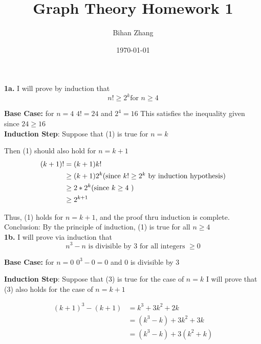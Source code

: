 \documentclass[12pt]{article}
\title{Graph Theory Homework 1}
\author{Bihan Zhang}
\date{\today}
\begin{document}
	\maketitle
	
	\textbf{1a.}
	I will prove by induction that 
    \begin{equation}
 		   n!\geq 2^k \mbox{for } n \geq 4 
	\end{equation}
  	  
  	\textbf{Base Case:} for $ n = 4 $ $ 4! = 24 $ and $ 2^4 = 16 $ This satisfies the inequality given since $ 24 \geq 16 $ \\
	  
	  
	\textbf{Induction Step}: Suppose that (1) is true for $ n = k $
	  
	Then (1) should also hold for $ n = k+1 $
	\begin{equation}
	\begin{split}
	(k+1)! & = (k+1)k!  \\
	& \geq (k+1)2^k \mbox{(since $ k! \geq 2^k $ by induction hypothesis)} \\
	& \geq 2*2^k \mbox{(since $ k \geq 4 $ )} \\
	& \geq 2^{k+1} 
	\end{split}
	\end{equation}
  
  	Thus, (1) holds for $ n = k + 1 $, and the proof thru induction is complete.
  	Conclusion: By the principle of induction, (1) is true for all $ n \geq 4 $ \\
  	
  	
  	\textbf{1b.} I will prove via induction that 
  	\begin{equation}
  		n^3-n \mbox{ is divisible by 3 for all integers } \geq 0  
  	\end{equation}
  
    \textbf{Base Case:} for $ n=0 $ $0^3-0 = 0$ and 0 is divisible by 3
  
	\textbf{Induction Step}: Suppose that (3) is true for the case of $ n = k $
	I will prove that (3) also holds for the case of $ n = k+1 $
	
	\begin{equation}
	\begin{split}
	(k+1)^3 - (k+1) & = k^3 + 3k^2 + 2k\\
	& = (k^3 - k) + 3k^2 + 3k  \\
	& = (k^3 - k) + 3(k^2 +k)  \\
	\end{split}
	\end{equation}
	
\end{document}
